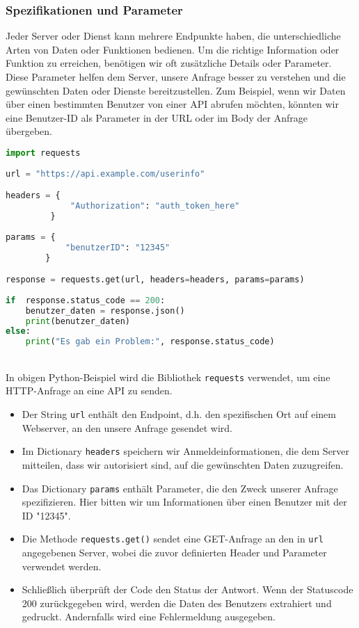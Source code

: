 \documentclass[12pt,a4paper]{article}
\begin{document}
\subsubsection{Spezifikationen und Parameter}
Jeder Server oder Dienst kann mehrere Endpunkte haben, die unterschiedliche Arten von Daten oder Funktionen bedienen. Um die richtige Information oder Funktion zu erreichen, benötigen wir oft zusätzliche Details oder Parameter. Diese Parameter helfen dem Server, unsere Anfrage besser zu verstehen und die gewünschten Daten oder Dienste bereitzustellen.
\newline
\newline
Zum Beispiel, wenn wir Daten über einen bestimmten Benutzer von einer API abrufen möchten, könnten wir eine Benutzer-ID als Parameter in der URL oder im Body der Anfrage übergeben.
\ \\
\begin{lstlisting}[language=Python, numbers = none]
import requests
	
url = "https://api.example.com/userinfo"

headers = {
	         "Authorization": "auth_token_here"
         }
     
params = {
	        "benutzerID": "12345"
        }

response = requests.get(url, headers=headers, params=params)
	
if  response.status_code == 200:
    benutzer_daten = response.json()
    print(benutzer_daten)
else:
    print("Es gab ein Problem:", response.status_code)
\end{lstlisting}
\ \\
In obigen Python-Beispiel wird die Bibliothek \texttt{requests} verwendet, um eine HTTP-Anfrage an eine API zu senden.
\begin{itemize}
	\item Der String \texttt{url} enthält den Endpoint, d.h. den spezifischen Ort auf einem Webserver, an den unsere Anfrage gesendet wird.
	\item Im Dictionary \texttt{headers} speichern wir Anmeldeinformationen, die dem Server mitteilen, dass wir autorisiert sind, auf die gewünschten Daten zuzugreifen.
	\item Das Dictionary \texttt{params} enthält Parameter, die den Zweck unserer Anfrage spezifizieren. Hier bitten wir um Informationen über einen Benutzer mit der ID "12345".
	\item Die Methode \texttt{requests.get()} sendet eine GET-Anfrage an den in \texttt{url} angegebenen Server, wobei die zuvor definierten Header und Parameter verwendet werden.
	\item Schließlich überprüft der Code den Status der Antwort. Wenn der Statuscode 200  zurückgegeben wird, werden die Daten des Benutzers extrahiert und gedruckt. Andernfalls wird eine Fehlermeldung ausgegeben.
\end{itemize}
\end{document}
